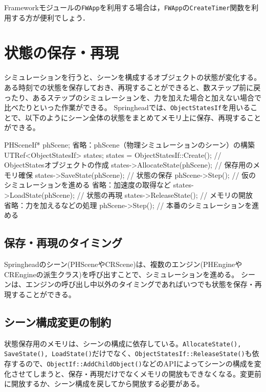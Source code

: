 Frameworkモジュールの\texttt{FWApp}を利用する場合は，\texttt{FWApp}の\texttt{CreateTimer}関数を利用する方が便利でしょう．


\section{状態の保存・再現}
\KLUDGE シミュレーションを行うと、シーンを構成するオブジェクトの状態が変化する。
\KLUDGE ある時刻での状態を保存しておき、再現することができると、数ステップ前に戻ったり、あるステップのシミュレーションを、力を加えた場合と加えない場合で比べたりといった作業ができる。
Springheadでは、\texttt{ObjectStatesIf}を用いることで、以下のようにシーン全体の状態をまとめてメモリ上に保存、再現することができる。

\begin{sourcecode}
	PHSceneIf* phScene;
\KLUDGE 	省略：phScene（物理シミュレーションのシーン）の構築
	UTRef<ObjectStatesIf> states;
	states = ObjectStatesIf::Create();	// ObjectStatesオブジェクトの作成
	states->AllocateState(phScene);		// 保存用のメモリ確保
	states->SaveState(phScene);			// 状態の保存
	phScene->Step();					// 仮のシミュレーションを進める
\KLUDGE 	省略：加速度の取得など
	states->LoadState(phScene);			// 状態の再現
	states->ReleaseState();				// メモリの開放
\KLUDGE 	省略：力を加えるなどの処理
	phScene->Step();					// 本番のシミュレーションを進める
\end{sourcecode}

\subsection{保存・再現のタイミング}
Springheadのシーン(PHSceneやCRScene)は、複数のエンジン(PHEngineやCREngineの派生クラス)を呼び出すことで、シミュレーションを進める。
\KLUDGE シーンは、エンジンの呼び出し中以外のタイミングであればいつでも状態を保存・再現することができる。

\subsection{シーン構成変更の制約}
\KLUDGE 状態保存用のメモリは、シーンの構成に依存している。\texttt{AllocateState(), SaveState(), LoadState()}だけでなく、\texttt{ObjectStatesIf::ReleaseState()}も依存するので、\texttt{ObjectIf::AddChildObject()}などのAPIによってシーンの構成を変化させてしまうと、保存・再現だけでなくメモリの開放もできなくなる。変更前に開放するか、シーン構成を戻してから開放する必要がある。
